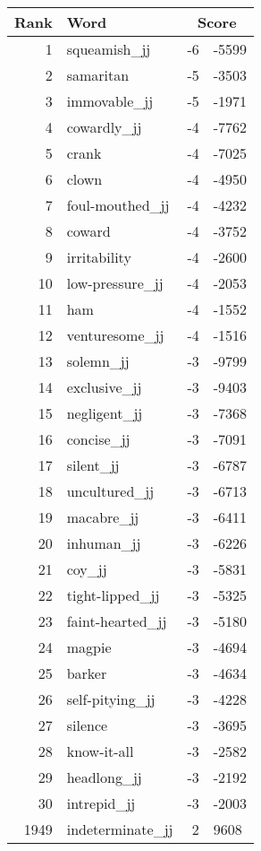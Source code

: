 \begin{longtable}[!htbp]{| rlr@{.}l |}
    \hline
    \textbf{Rank} & \textbf{Word} & \multicolumn{2}{c|}{\textbf{Score}} \\
    \hline
    \endhead
    1 & squeamish\_jj & -6 & -5599 \\
    2 & samaritan & -5 & -3503 \\
    3 & immovable\_jj & -5 & -1971 \\
    4 & cowardly\_jj & -4 & -7762 \\
    5 & crank & -4 & -7025 \\
    6 & clown & -4 & -4950 \\
    7 & foul-mouthed\_jj & -4 & -4232 \\
    8 & coward & -4 & -3752 \\
    9 & irritability & -4 & -2600 \\
    10 & low-pressure\_jj & -4 & -2053 \\
    11 & ham & -4 & -1552 \\
    12 & venturesome\_jj & -4 & -1516 \\
    13 & solemn\_jj & -3 & -9799 \\
    14 & exclusive\_jj & -3 & -9403 \\
    15 & negligent\_jj & -3 & -7368 \\
    16 & concise\_jj & -3 & -7091 \\
    17 & silent\_jj & -3 & -6787 \\
    18 & uncultured\_jj & -3 & -6713 \\
    19 & macabre\_jj & -3 & -6411 \\
    20 & inhuman\_jj & -3 & -6226 \\
    21 & coy\_jj & -3 & -5831 \\
    22 & tight-lipped\_jj & -3 & -5325 \\
    23 & faint-hearted\_jj & -3 & -5180 \\
    24 & magpie & -3 & -4694 \\
    25 & barker & -3 & -4634 \\
    26 & self-pitying\_jj & -3 & -4228 \\
    27 & silence & -3 & -3695 \\
    28 & know-it-all & -3 & -2582 \\
    29 & headlong\_jj & -3 & -2192 \\
    30 & intrepid\_jj & -3 & -2003 \\
    1949 & indeterminate\_jj & 2 & 9608 \\

\end{longtable}

